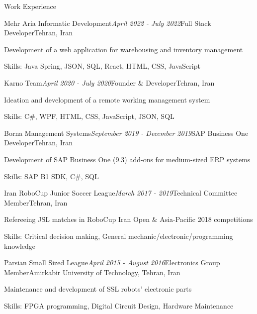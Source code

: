 \documentclass{resume} %
\begin{document}
\begin{rSection}{Work Experience}

  \begin{rSubsection}{Mehr Aria Informatic Development}{\em April 2022 - July 2022}{Full Stack Developer}{Tehran, Iran}
    \item Development of a web application for warehousing and inventory management
    \item Skills: Java Spring, JSON, SQL, React, HTML, CSS, JavaScript
  \end{rSubsection}


  \begin{rSubsection}{Karno Team}{\em April 2020 - July 2020}{Founder \& Developer}{Tehran, Iran}
    \item Ideation and development of a remote working management system
    \item Skills: C\#, WPF, HTML, CSS, JavaScript, JSON, SQL
  \end{rSubsection}


  \begin{rSubsection}{Borna Management Systems}{\em September 2019 - December 2019}{SAP Business One Developer}{Tehran, Iran}
    \item Development of SAP Business One (9.3) add-ons for medium-sized ERP systems
    \item Skills: SAP B1 SDK, C\#, SQL
  \end{rSubsection}


  \begin{rSubsection}{Iran RoboCup Junior Soccer League}{\em March 2017 - 2019}{Technical Committee Member}{Tehran, Iran}
    \item Refereeing JSL matches in RoboCup Iran Open \& Asia-Pacific 2018 competitions
    \item Skills: Critical decision making, General mechanic/electronic/programming knowledge
  \end{rSubsection}


  \begin{rSubsection}{Parsian Small Sized League}{\em April 2015 - August 2016}{Electronics Group Member}{Amirkabir University of Technology, Tehran, Iran}
    \item Maintenance and development of SSL robots' electronic parts
    \item Skills: FPGA programming, Digital Circuit Design, Hardware Maintenance
  \end{rSubsection}

\end{rSection}
\end{document}

